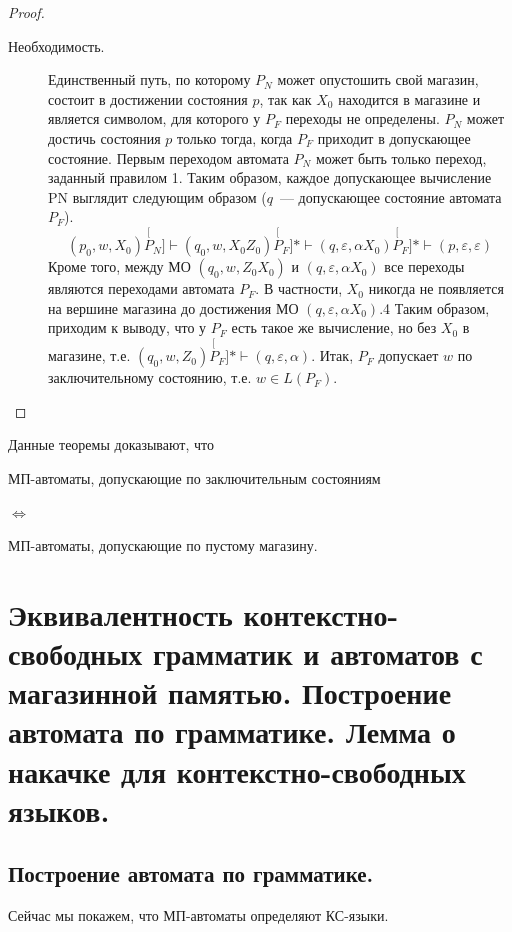 \documentclass[a4paper,12pt]{article}
\begin{document}
\begin{proof}
\begin{description}
		\item[Необходимость.] Единственный путь, по которому \(P_N\) может опустошить свой магазин, состоит в достижении состояния \(p\), так как \(X_0\) находится в магазине и является символом, для которого у \(P_F\) переходы не определены. \(P_N\) может достичь состояния \(p\) только тогда, когда \(P_F\) приходит в допускающее состояние. Первым переходом автомата \(P_N\) может быть только переход, заданный правилом 1. Таким образом, каждое допускающее вычисление PN выглядит следующим образом (\(q\)~--- допускающее состояние автомата \(P_F\)).
		\[(p_0, w, X_0) \stackrel[P_N]{}{\vdash} (q_0, w, X_0Z_0)  \stackrel[P_F]{*}{\vdash} (q, \varepsilon, \alpha X_0) \stackrel[P_F]{*}{\vdash} (p, \varepsilon, \varepsilon)\]
		Кроме того, между МО \((q_0, w, Z_0X_0)\) и \((q, \varepsilon, \alpha X_0)\) все переходы являются переходами автомата \(P_F\). В частности, \(X_0\) никогда не появляется на вершине магазина до достижения МО \((q, \varepsilon, \alpha X_0)\).4 Таким образом, приходим к выводу, что у \(P_F\) есть такое же вычисление, но без \(X_0\) в магазине, т.е. \((q_0, w, Z_0) \stackrel[P_F]{*}{\vdash} (q, \varepsilon, \alpha)\). Итак, \(P_F\) допускает \(w\) по заключительному состоянию, т.е. \(w \in L(P_F)\).
	\end{description}
\end{proof}

Данные теоремы доказывают, что
\begin{center}
	\begin{minipage}[c]{0.4\textwidth}
		\center МП-автоматы, допускающие по заключительным состояниям
	\end{minipage}
	 \(\iff\) 
	 \begin{minipage}[c]{0.4\textwidth}
	 	\center МП-автоматы, допускающие по пустому магазину.
	 \end{minipage}
\end{center}

\section{Эквивалентность контекстно-свободных грамматик и автоматов с магазинной памятью. Построение автомата по грамматике. Лемма о накачке для контекстно-свободных языков. }
\subsection{Построение автомата по грамматике.}
Сейчас мы покажем, что МП-автоматы определяют КС-языки.
\end{document}
